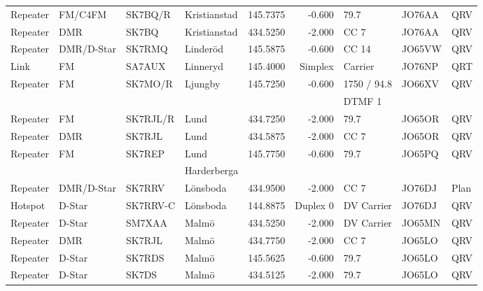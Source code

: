 \begin{longtable}{llllrrlll}
Repeater & FM/C4FM         & SK7BQ/R  & Kristianstad & 145.7375     & -0.600     & 79.7         & JO76AA      & QRV      \\
Repeater & DMR             & SK7BQ    & Kristianstad & 434.5250     & -2.000     & CC 7         & JO76AA      & QRV      \\
Repeater & DMR/D-Star      & SK7RMQ   & Linderöd     & 145.5875     & -0.600     & CC 14        & JO65VW      & QRV      \\
Link     & FM              & SA7AUX   & Linneryd     & 145.4000     & Simplex    & Carrier      & JO76NP      & QRT      \\
Repeater & FM              & SK7MO/R  & Ljungby      & 145.7250     & -0.600     & 1750 / 94.8  & JO66XV      & QRV      \\
         &                 &          &              &              &            & DTMF 1       &             &          \\
Repeater & FM              & SK7RJL/R & Lund         & 434.7250     & -2.000     & 79.7         & JO65OR      & QRV      \\
Repeater & DMR             & SK7RJL   & Lund         & 434.5875     & -2.000     & CC 7         & JO65OR      & QRV      \\
Repeater & FM              & SK7REP   & Lund         & 145.7750     & -0.600     & 79.7         & JO65PQ      & QRV      \\
         &                 &          & Harderberga  &              &            &              &             &          \\
Repeater & DMR/D-Star      & SK7RRV   & Lönsboda     & 434.9500     & -2.000     & CC 7         & JO76DJ      & Plan     \\
Hotspot  & D-Star          & SK7RRV-C & Lönsboda     & 144.8875     & Duplex 0   & DV Carrier   & JO76DJ      & QRV      \\
Repeater & D-Star          & SM7XAA   & Malmö        & 434.5250     & -2.000     & DV Carrier   & JO65MN      & QRV      \\
Repeater & DMR             & SK7RJL   & Malmö        & 434.7750     & -2.000     & CC 7         & JO65LO      & QRV      \\
Repeater & D-Star          & SK7RDS   & Malmö        & 145.5625     & -0.600     & 79.7         & JO65LO      & QRV      \\
Repeater & D-Star          & SK7DS    & Malmö        & 434.5125     & -2.000     & 79.7         & JO65LO      & QRV      \\

\end{longtable}
